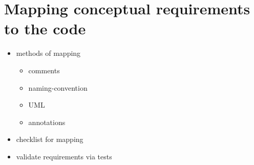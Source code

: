\section{Mapping conceptual requirements to the code}
\begin{itemize}
	\item{methods of mapping}
	\begin{itemize}
		\item{comments}
		\item{naming-convention}
		\item{UML}
		\item{annotations}
	\end{itemize}
	\item{checklist for mapping}
	\item{validate requirements via tests}
\end{itemize}